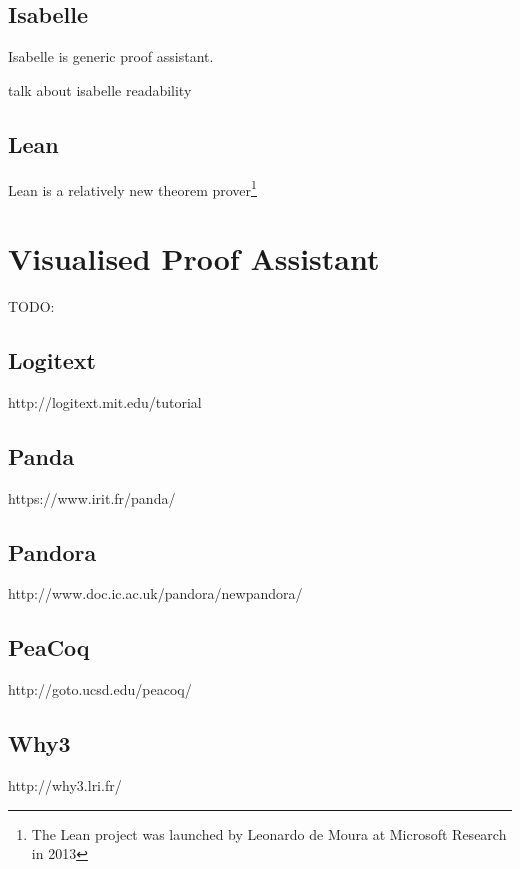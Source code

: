\documentclass[master.tex]{subfiles}
\begin{document}
\subsection{Isabelle}

Isabelle\supercite{isabelle-official-website} is generic proof assistant.



talk about isabelle readability

\subsection{Lean}
Lean\supercite{lean-offical-website} is a relatively new theorem
prover\footnote{The Lean project was launched by Leonardo de Moura at Microsoft
  Research in 2013}

\section{Visualised Proof Assistant}
TODO:

\subsection{Logitext}
http://logitext.mit.edu/tutorial

\subsection{Panda}
https://www.irit.fr/panda/

\subsection{Pandora}
http://www.doc.ic.ac.uk/pandora/newpandora/

\subsection{PeaCoq}
http://goto.ucsd.edu/peacoq/

\subsection{Why3}
http://why3.lri.fr/
\end{document}
